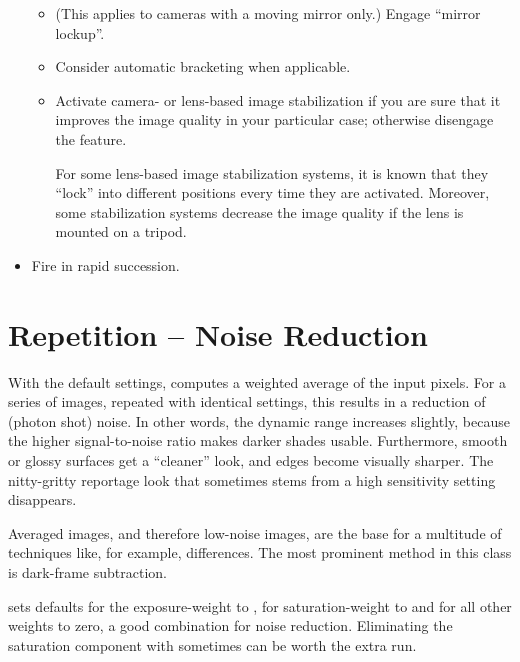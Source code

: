 \begin{itemize}
\begin{itemize}
  \item
    (This applies to cameras with a moving mirror only.)  Engage ``mirror lockup''.

  \item
    Consider automatic bracketing when applicable.

  \item
    Activate camera- or lens-based image stabilization if you are sure that it improves the
    image quality in your particular case; otherwise disengage the feature.

    For some lens-based image stabilization systems, it is known that they ``lock'' into
    different positions every time they are activated.  Moreover, some stabilization systems
    decrease the image quality if the lens is mounted on a tripod.
  \end{itemize}

\item
  Fire in rapid succession.
\end{itemize}




\section[Repetition -- Noise Reduction]{\label{sec:repetition}%
  Repetition -- Noise Reduction}


With the default settings, \App{} computes a weighted average of the input pixels.  For a series
of images, repeated with identical settings, this results in a reduction of (photon shot) noise.
In other words, the dynamic range increases slightly, because the higher signal-to-noise ratio
makes darker shades usable.  Furthermore, smooth or glossy surfaces get a ``cleaner'' look, and
edges become visually sharper.  The nitty-gritty reportage look that sometimes stems from a high
sensitivity setting disappears.

Averaged images, and therefore low-noise images, are the base for a multitude of techniques
like, for example, differences.  The most prominent method in this class is dark-frame
subtraction.

\App{} sets defaults for the exposure-weight to , for
saturation-weight to  and for all other weights to zero, a
good combination for noise reduction.  Eliminating the saturation component with
 sometimes can be worth the extra run.


